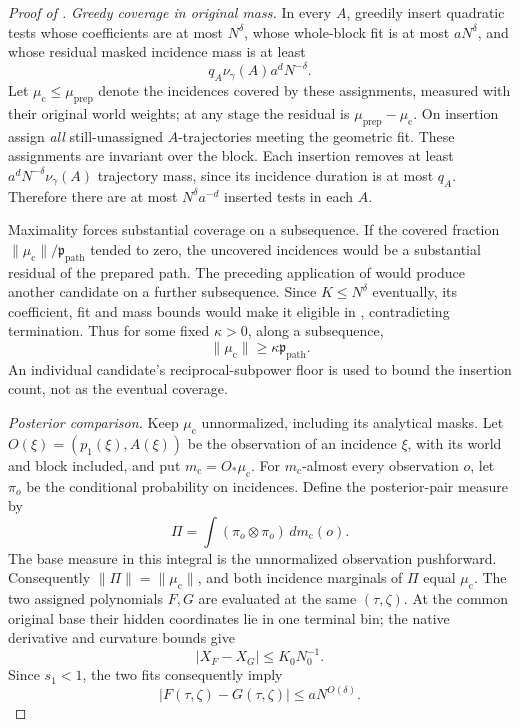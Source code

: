 \begin{proof}[Proof of ]
\emph{Greedy coverage in original mass.}
In every \(A\), greedily insert quadratic tests whose coefficients
are at most \(N^\delta\), whose whole-block fit is at most
\(aN^\delta\), and whose residual masked incidence mass is at least
\begin{equation}
 \label{a08:greedy-floor}
 q_A\nu_\gamma(A)a^dN^{-\delta}.
\end{equation}
Let \(\mu_{\mathrm c}\le\mu_{\mathrm{prep}}\) denote the incidences
covered by these assignments, measured with their original world
weights; at any stage the residual is
\(\mu_{\mathrm{prep}}-\mu_{\mathrm c}\).
On insertion assign \emph{all} still-unassigned \(A\)-trajectories
meeting the geometric fit.  These assignments are invariant over
the block.  Each insertion removes at least
\(a^dN^{-\delta}\nu_\gamma(A)\) trajectory mass, since its
incidence duration is at most \(q_A\).  Therefore there are at most
\(N^\delta a^{-d}\) inserted tests in each \(A\).

Maximality forces substantial coverage on a subsequence.  If the
covered fraction \(\|\mu_{\mathrm c}\|/\mathfrak p_{\mathrm{path}}\)
tended to zero, the uncovered incidences would be a
substantial residual of the prepared path.  The preceding
application of  would produce
another candidate on a further subsequence.  Since \(K\le N^\delta\)
eventually, its coefficient, fit and mass bounds would make it
eligible in , contradicting termination.
Thus for some fixed \(\kappa>0\), along a subsequence,
\[
 \|\mu_{\mathrm c}\|\ge\kappa\mathfrak p_{\mathrm{path}}.
\]
An individual candidate's reciprocal-subpower floor is used to
bound the insertion count, not as the eventual coverage.

\emph{Posterior comparison.}
Keep \(\mu_{\mathrm c}\) unnormalized, including its analytical
masks.  Let \(O(\xi)=(p_1(\xi),A(\xi))\) be the observation of an
incidence \(\xi\), with its world and block included, and put
\(m_{\mathrm c}=O_*\mu_{\mathrm c}\).
For \(m_{\mathrm c}\)-almost every observation \(o\), let
\(\pi_o\) be the conditional probability on incidences.  Define the
posterior-pair measure by
\begin{equation}
 \label{a08:posterior-pair-law}
 \Pi=\int (\pi_o\otimes\pi_o)\,dm_{\mathrm c}(o).
\end{equation}
The base measure in this integral is the unnormalized observation
pushforward.  Consequently \(\|\Pi\|=\|\mu_{\mathrm c}\|\), and
both incidence marginals of \(\Pi\) equal \(\mu_{\mathrm c}\).
The two assigned polynomials \(F,G\) are evaluated at the same
\((\tau,\zeta)\).  At the common original base their hidden
coordinates lie in one terminal bin; the native derivative and
curvature bounds give
\[
 |X_F-X_G|\le K_0N_0^{-1}.
\]
Since \(s_1<1\), the two fits consequently imply
\begin{equation}
 \label{a08:posterior-match}
 |F(\tau,\zeta)-G(\tau,\zeta)|
        \le aN^{O(\delta)}.
\end{equation}


\end{proof}
